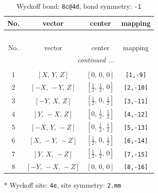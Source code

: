 \documentclass[fleqn,8pt]{jsarticle}
\begin{document}
\renewcommand{\arraystretch}{1.2}
\begin{longtable}{cccc}
\caption{Wyckoff bond: {\tt 8c@4d}, bond symmetry: {\tt -1}}
 \\
 \hline \hline
No. & vector & center & mapping \\ \hline \endfirsthead

\multicolumn{3}{l}{\tablename\ \thetable{}} \\
 \hline \hline
No. & vector & center & mapping \\ \hline \endhead

 \hline \hline
\multicolumn{3}{r}{\footnotesize\it continued ...} \\ \endfoot

 \hline \hline
\multicolumn{3}{r}{} \\ \endlastfoot

1 & $\left[ X,\, Y,\, Z \right]$ & $\left[ 0,\, 0,\, 0 \right]$ & {\tt [1,-9]} \\ \hline
2 & $\left[ - X,\, - Y,\, Z \right]$ & $\left[ \frac{1}{2},\, \frac{1}{2},\, 0 \right]$ & {\tt [2,-10]} \\ \hline
3 & $\left[ - Y,\, X,\, Z \right]$ & $\left[ \frac{1}{2},\, 0,\, \frac{1}{2} \right]$ & {\tt [3,-11]} \\ \hline
4 & $\left[ Y,\, - X,\, Z \right]$ & $\left[ 0,\, \frac{1}{2},\, \frac{1}{2} \right]$ & {\tt [4,-12]} \\ \hline
5 & $\left[ - X,\, Y,\, - Z \right]$ & $\left[ 0,\, \frac{1}{2},\, \frac{1}{2} \right]$ & {\tt [5,-13]} \\ \hline
6 & $\left[ X,\, - Y,\, - Z \right]$ & $\left[ \frac{1}{2},\, 0,\, \frac{1}{2} \right]$ & {\tt [6,-14]} \\ \hline
7 & $\left[ Y,\, X,\, - Z \right]$ & $\left[ \frac{1}{2},\, \frac{1}{2},\, 0 \right]$ & {\tt [7,-15]} \\ \hline
8 & $\left[ - Y,\, - X,\, - Z \right]$ & $\left[ 0,\, 0,\, 0 \right]$ & {\tt [8,-16]} \\
\end{longtable}
* Wyckoff site: {\tt 4e}, site symmetry: {\tt 2.mm}
\renewcommand{\arraystretch}{1.2}
\end{document}
